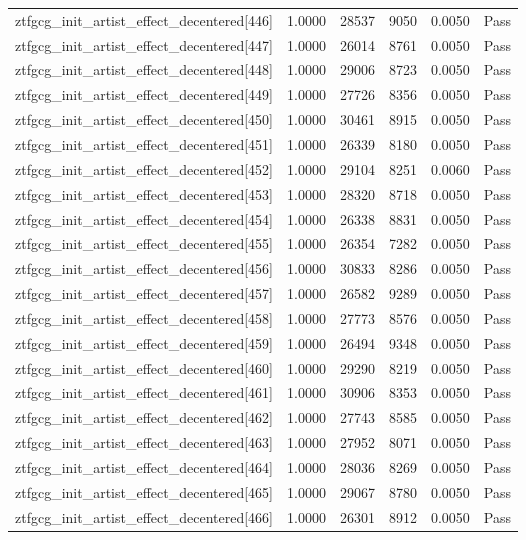 \begin{table}[htbp]
\begin{tabular}{llrrll}
ztfgcg\_init\_artist\_effect\_decentered[446] & 1.0000 & 28537 & 9050 & 0.0050 & Pass \\
ztfgcg\_init\_artist\_effect\_decentered[447] & 1.0000 & 26014 & 8761 & 0.0050 & Pass \\
ztfgcg\_init\_artist\_effect\_decentered[448] & 1.0000 & 29006 & 8723 & 0.0050 & Pass \\
ztfgcg\_init\_artist\_effect\_decentered[449] & 1.0000 & 27726 & 8356 & 0.0050 & Pass \\
ztfgcg\_init\_artist\_effect\_decentered[450] & 1.0000 & 30461 & 8915 & 0.0050 & Pass \\
ztfgcg\_init\_artist\_effect\_decentered[451] & 1.0000 & 26339 & 8180 & 0.0050 & Pass \\
ztfgcg\_init\_artist\_effect\_decentered[452] & 1.0000 & 29104 & 8251 & 0.0060 & Pass \\
ztfgcg\_init\_artist\_effect\_decentered[453] & 1.0000 & 28320 & 8718 & 0.0050 & Pass \\
ztfgcg\_init\_artist\_effect\_decentered[454] & 1.0000 & 26338 & 8831 & 0.0050 & Pass \\
ztfgcg\_init\_artist\_effect\_decentered[455] & 1.0000 & 26354 & 7282 & 0.0050 & Pass \\
ztfgcg\_init\_artist\_effect\_decentered[456] & 1.0000 & 30833 & 8286 & 0.0050 & Pass \\
ztfgcg\_init\_artist\_effect\_decentered[457] & 1.0000 & 26582 & 9289 & 0.0050 & Pass \\
ztfgcg\_init\_artist\_effect\_decentered[458] & 1.0000 & 27773 & 8576 & 0.0050 & Pass \\
ztfgcg\_init\_artist\_effect\_decentered[459] & 1.0000 & 26494 & 9348 & 0.0050 & Pass \\
ztfgcg\_init\_artist\_effect\_decentered[460] & 1.0000 & 29290 & 8219 & 0.0050 & Pass \\
ztfgcg\_init\_artist\_effect\_decentered[461] & 1.0000 & 30906 & 8353 & 0.0050 & Pass \\
ztfgcg\_init\_artist\_effect\_decentered[462] & 1.0000 & 27743 & 8585 & 0.0050 & Pass \\
ztfgcg\_init\_artist\_effect\_decentered[463] & 1.0000 & 27952 & 8071 & 0.0050 & Pass \\
ztfgcg\_init\_artist\_effect\_decentered[464] & 1.0000 & 28036 & 8269 & 0.0050 & Pass \\
ztfgcg\_init\_artist\_effect\_decentered[465] & 1.0000 & 29067 & 8780 & 0.0050 & Pass \\
ztfgcg\_init\_artist\_effect\_decentered[466] & 1.0000 & 26301 & 8912 & 0.0050 & Pass \\

\end{tabular}
\end{table}
